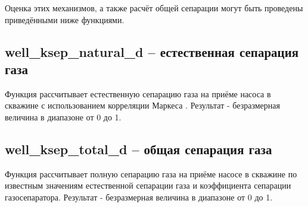 Оценка этих механизмов, а также расчёт общей сепарации могут быть проведены приведёнными ниже функциями.

\subsection{well\_ksep\_natural\_d – естественная сепарация газа}
Функция рассчитывает естественную сепарацию газа на приёме насоса в скважине с использованием корреляции Маркеса \cite{Marquez_2003} . Результат - безразмерная величина в диапазоне от 0 до 1. 







\subsection{well\_ksep\_total\_d – общая сепарация газа}

Функция рассчитывает полную сепарацию газа на приёме насосе в скважине по известным значениям естественной сепарации газа и коэффициента сепарации газосепаратора. Результат - безразмерная величина в диапазоне от 0 до 1. 

